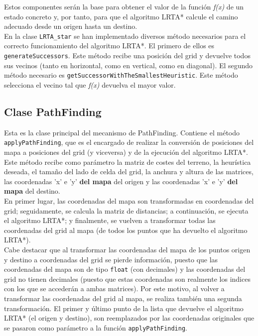 Estos componentes serán la base para obtener el valor de la función \textit{f(x)} de un estado concreto y, por tanto, para que el algoritmo LRTA* calcule el camino adecuado desde un origen hasta un destino. \\

En la clase \texttt{LRTA\_star} se han implementado diversos método necesarios para el correcto funcionamiento del algoritmo LRTA*. El primero de ellos es \texttt{generateSuccessors}. Este método recibe una posición del grid y devuelve todos sus vecinos (tanto en horizontal, como en vertical, como en diagonal). El segundo método necesario es \texttt{getSuccessorWithTheSmallestHeuristic}. Este método selecciona el vecino tal que \textit{f(x)} devuelva el mayor valor.

\subsection{Clase PathFinding}

Esta es la clase principal del mecanismo de PathFinding. Contiene el método \texttt{applyPathFinding}, que es el encargado de realizar la conversión de posiciones del mapa a posiciones del grid (y viceversa) y de la ejecución del algoritmo LRTA*. Este método recibe como parámetro la matriz de costes del terreno, la heurística deseada, el tamaño del lado de celda del grid, la anchura y altura de las matrices, las coordenadas 'x' e 'y' \textbf{del mapa} del origen y las coordenadas 'x' e 'y' \textbf{del mapa} del destino. \\

En primer lugar, las coordenadas del mapa son transformadas en coordenadas del grid; seguidamente, se calcula la matriz de distancias; a continuación, se ejecuta el algoritmo LRTA*; y finalmente, se vuelven a transformar todas las coordenadas del grid al mapa (de todos los puntos que ha devuelto el algoritmo LRTA*). \\

Cabe destacar que al transformar las coordenadas del mapa de los puntos origen y destino a coordenadas del grid se pierde información, puesto que las coordenadas del mapa son de tipo \texttt{float} (con decimales) y las coordenadas del grid no tienen decimales (puesto que estas coordenadas son realmente los indices con los que se accederán a ambas matrices). Por este motivo, al volver a transformar las coordenadas del grid al mapa, se realiza también una segunda transformación. El primer y último punto de la lista que devuelve el algoritmo LRTA* (el origen y destino), son reemplazados por las coordenadas originales que se pasaron como parámetro a la función \texttt{applyPathFinding}.

